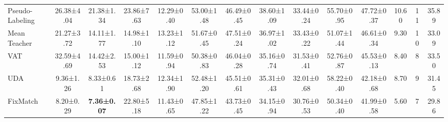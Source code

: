 \documentclass{article}
\begin{document}
\begin{table}[t!]
{\begin{tabular}{l|cc|cc|cc|cc|cc|c|c|c}
Pseudo-Labeling  & 26.38\tiny{±4.04}                      & 21.38\tiny{±1.34}                       & 23.86\tiny{±7.63}                       & 12.29\tiny{±0.40}                        & 53.00\tiny{±1.48}                              & 46.49\tiny{±0.45}                               & 38.60\tiny{±1.09}                              & 33.44\tiny{±0.24}                               & 55.70\tiny{±0.95}                            & 47.72\tiny{±0.37}                             & 10.60                             & 11                             & 35.89                               \\
Mean Teacher     & 21.27\tiny{±3.72}                      & 14.11\tiny{±1.77}                       & 14.98\tiny{±1.10}                       & 13.23\tiny{±1.12}                        & 51.67\tiny{±0.45}                              & 47.51\tiny{±0.24}                               & 36.97\tiny{±1.02}                              & 33.43\tiny{±0.22}                               & 51.07\tiny{±1.44}                            & 46.61\tiny{±0.34}                             & 9.30                              & 10                             & 33.09                               \\
VAT              & 32.59\tiny{±4.69}                      & 14.42\tiny{±2.53}                       & 15.00\tiny{±1.12}                       & 11.59\tiny{±0.94}                        & 50.38\tiny{±0.83}                              & 46.04\tiny{±0.28}                               & 35.16\tiny{±0.74}                              & 31.53\tiny{±0.41}                               & 52.76\tiny{±0.87}                            & 45.53\tiny{±0.13}                             & 8.40                              & 8                              & 33.50                               \\
UDA              & 9.36\tiny{±1.26}                       & 8.33\tiny{±0.61}                        & 18.73\tiny{±2.68}                       & 12.34\tiny{±1.90}                        & 52.48\tiny{±1.20}                              & 45.51\tiny{±0.61}                               & 35.31\tiny{±0.43}                              & 32.01\tiny{±0.68}                               & 58.22\tiny{±0.40}                            & 42.18\tiny{±0.68}                             & 8.70                              & 9                              & 31.45                               \\
FixMatch         & 8.20\tiny{±0.29}                       & \textbf{7.36\tiny{±0.07}}               & 22.80\tiny{±5.18}                       & 11.43\tiny{±0.65}                        & 47.85\tiny{±1.22}                              & 43.73\tiny{±0.45}                               & 34.15\tiny{±0.94}                              & 30.76\tiny{±0.53}                               & 50.34\tiny{±0.40}                            & 41.99\tiny{±0.58}                             & 5.60                              & 7                              & 29.86                               \\

\end{tabular}}
\end{table}
\end{document}
